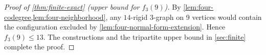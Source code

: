 \documentclass[10pt]{article}
\numberwithin{equation}{section}
\theoremstyle{definition}
\begin{document}
\begin{proof}[Proof of \cref{thm:finite-exact} (upper bound for $f_3(9)$)]
By \cref{lem:four-codegree,lem:four-neighborhood}, any $14$-rigid $3$-graph on 9 vertices would contain the configuration excluded by \cref{lem:four-normal-form-extension}. Hence $f_3(9)\le13$. The constructions and the tripartite upper bound in \cref{sec:finite} complete the proof.
\end{proof}





\end{document}
